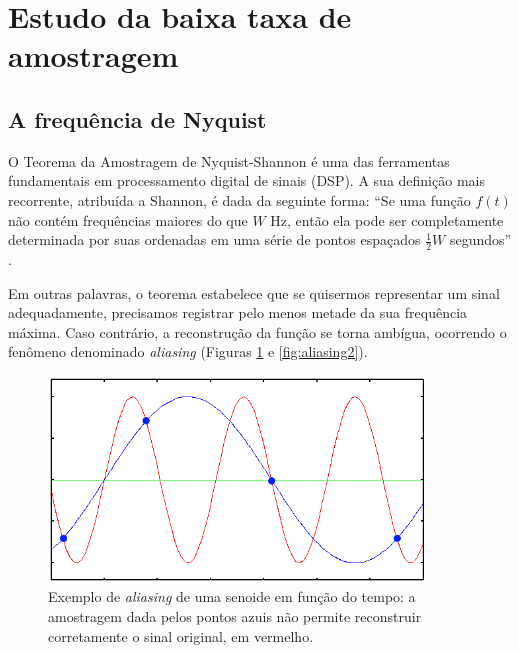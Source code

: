 \documentclass[12pt]{article}
\begin{document}
		\clearpage
	\section{Estudo da baixa taxa de amostragem}
		
		\subsection{A frequência de Nyquist}
		O Teorema da Amostragem de Nyquist-Shannon é uma das ferramentas fundamentais em processamento digital de sinais (DSP). A sua definição mais recorrente, atribuída a Shannon, é dada da seguinte forma: ``Se uma função $f(t)$ não contém frequências maiores do que $W$ Hz, então ela pode ser completamente determinada por suas ordenadas em uma série de pontos espaçados $\frac{1}{2}W$ segundos'' \cite{Shannon-1949}.
		
		Em outras palavras, o teorema estabelece que se quisermos representar um sinal adequadamente, precisamos registrar pelo menos metade da sua frequência máxima. Caso contrário, a reconstrução da função se torna ambígua, ocorrendo o fenômeno denominado \textit{aliasing} (Figuras \ref{fig:aliasing} e \ref{fig:aliasing2}).
		
		\begin{figure}[!ht]
			\centering
			\includegraphics[width=10cm]{imgs/aliasing_one_dim.png}
			\caption{\footnotesize {Exemplo de \textit{aliasing} de uma senoide em função do tempo: a amostragem dada pelos pontos azuis não permite reconstruir corretamente o sinal original, em vermelho.}}
			\label{fig:aliasing}
			\vspace{5mm}
		\end{figure}
		
\end{document}
